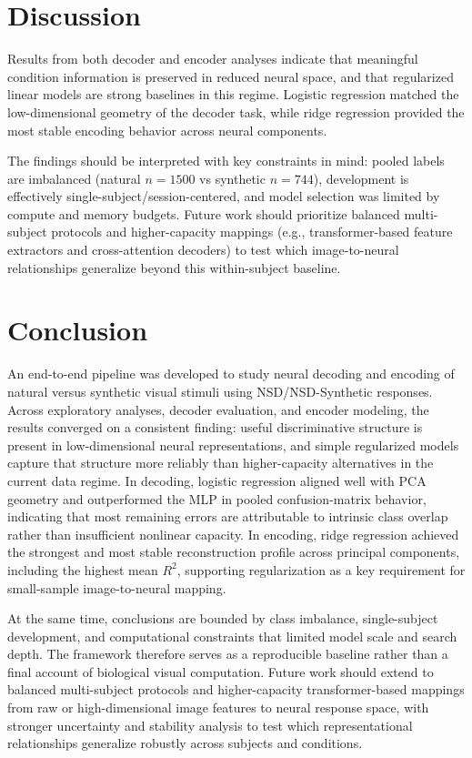 \documentclass[11pt]{article}
\begin{document}
\FloatBarrier
\section{Discussion}
Results from both decoder and encoder analyses indicate that meaningful condition information is preserved in reduced neural space, and that regularized linear models are strong baselines in this regime. Logistic regression matched the low-dimensional geometry of the decoder task, while ridge regression provided the most stable encoding behavior across neural components.

The findings should be interpreted with key constraints in mind: pooled labels are imbalanced (natural $n=1500$ vs synthetic $n=744$), development is effectively single-subject/session-centered, and model selection was limited by compute and memory budgets. Future work should prioritize balanced multi-subject protocols and higher-capacity mappings (e.g., transformer-based feature extractors and cross-attention decoders) to test which image-to-neural relationships generalize beyond this within-subject baseline.

\section{Conclusion}
An end-to-end pipeline was developed to study neural decoding and encoding of natural versus synthetic visual stimuli using NSD/NSD-Synthetic responses. Across exploratory analyses, decoder evaluation, and encoder modeling, the results converged on a consistent finding: useful discriminative structure is present in low-dimensional neural representations, and simple regularized models capture that structure more reliably than higher-capacity alternatives in the current data regime. In decoding, logistic regression aligned well with PCA geometry and outperformed the MLP in pooled confusion-matrix behavior, indicating that most remaining errors are attributable to intrinsic class overlap rather than insufficient nonlinear capacity. In encoding, ridge regression achieved the strongest and most stable reconstruction profile across principal components, including the highest mean $R^2$, supporting regularization as a key requirement for small-sample image-to-neural mapping.

At the same time, conclusions are bounded by class imbalance, single-subject development, and computational constraints that limited model scale and search depth. The framework therefore serves as a reproducible baseline rather than a final account of biological visual computation. Future work should extend to balanced multi-subject protocols and higher-capacity transformer-based mappings from raw or high-dimensional image features to neural response space, with stronger uncertainty and stability analysis to test which representational relationships generalize robustly across subjects and conditions.
\end{document}
